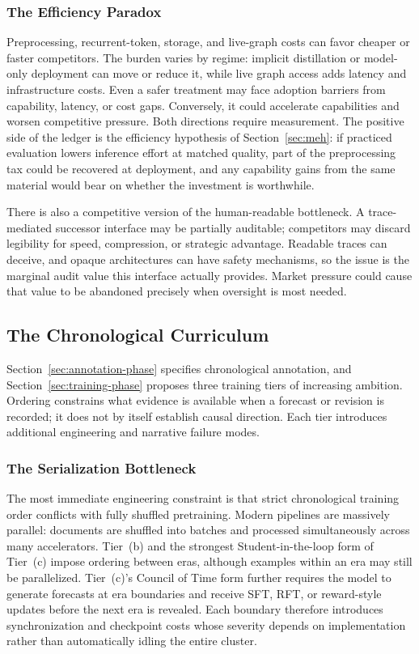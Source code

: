 \documentclass[11pt]{article}
\begin{document}
\subsubsection{The Efficiency Paradox}\label{sec:efficiency-paradox}

Preprocessing, recurrent-token, storage, and live-graph costs can favor cheaper
or faster competitors. The burden varies by regime:
implicit distillation or model-only deployment can move or reduce it, while live
graph access adds latency and infrastructure costs. Even a safer treatment may
face adoption barriers from capability, latency, or cost gaps. Conversely, it
could accelerate capabilities and worsen competitive pressure. Both directions
require measurement. The positive side of the ledger is the efficiency
hypothesis of Section~\ref{sec:meh}: if practiced evaluation lowers inference
effort at matched quality, part of the preprocessing tax could be recovered at
deployment, and any capability gains from the same material would bear on
whether the investment is worthwhile.

There is also a competitive version of the human-readable bottleneck. A
trace-mediated successor interface may be partially auditable; competitors may
discard legibility for speed, compression, or strategic advantage. Readable
traces can deceive, and opaque architectures can have safety mechanisms, so the
issue is the marginal audit value this interface actually provides. Market
pressure could cause that value to be abandoned precisely when oversight is
most needed.

\subsection{The Chronological Curriculum}\label{sec:limitations-chronological}

Section~\ref{sec:annotation-phase} specifies chronological annotation, and
Section~\ref{sec:training-phase} proposes three training tiers of increasing
ambition. Ordering constrains what evidence is available when a forecast or
revision is recorded; it does not by itself establish causal direction. Each
tier introduces additional engineering and narrative failure modes.

\subsubsection{The Serialization Bottleneck}

The most immediate engineering constraint is that strict chronological training
order conflicts with fully shuffled pretraining. Modern pipelines are massively
parallel: documents are shuffled into batches and processed simultaneously
across many accelerators. Tier~(b) and the strongest Student-in-the-loop form of
Tier~(c) impose ordering between eras, although examples within an era may still
be parallelized. Tier~(c)'s Council of Time form \cite{westerberg2026thl}
further requires the model to generate forecasts at era boundaries and receive
SFT, RFT, or reward-style updates before the next era is revealed. Each boundary
therefore introduces synchronization and checkpoint costs whose severity
depends on implementation rather than automatically idling the entire cluster.
\end{document}
